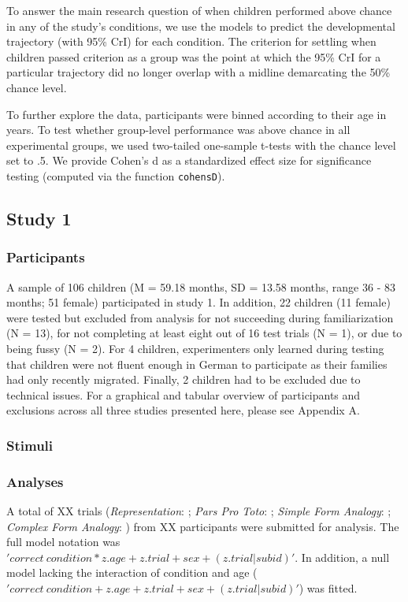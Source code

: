 \documentclass[
  man]{apa6}
\begin{document}
To answer the main research question of when children performed above chance in any of the study's conditions, we use the models to predict the developmental trajectory (with 95\% CrI) for each condition. The criterion for settling when children passed criterion as a group was the point at which the 95\% CrI for a particular trajectory did no longer overlap with a midline demarcating the 50\% chance level.

To further explore the data, participants were binned according to their age in years. To test whether group-level performance was above chance in all experimental groups, we used two-tailed one-sample t-tests with the chance level set to .5. We provide Cohen's d as a standardized effect size for significance testing (computed via the function \texttt{cohensD}).

\subsection{Study 1}\label{study-1}

\subsubsection{Participants}\label{participants}

A sample of 106 children (M = 59.18 months, SD = 13.58 months, range 36 - 83 months; 51 female) participated in study 1. In addition, 22 children (11 female) were tested but excluded from analysis for not succeeding during familiarization (N = 13), for not completing at least eight out of 16 test trials (N = 1), or due to being fussy (N = 2). For 4 children, experimenters only learned during testing that children were not fluent enough in German to participate as their families had only recently migrated. Finally, 2 children had to be excluded due to technical issues. For a graphical and tabular overview of participants and exclusions across all three studies presented here, please see Appendix A.

\subsubsection{Stimuli}\label{stimuli}

\subsubsection{Analyses}\label{analyses}

A total of XX trials (\emph{Representation}: ; \emph{Pars Pro Toto}: ; \emph{Simple Form Analogy}: ; \emph{Complex Form Analogy}: ) from XX participants were submitted for analysis. The full model notation was \('correct~condition*z.age+z.trial+sex+(z.trial|subid)'\). In addition, a null model lacking the interaction of condition and age (\('correct~condition+z.age+z.trial+sex+(z.trial|subid)'\)) was fitted.
\end{document}
